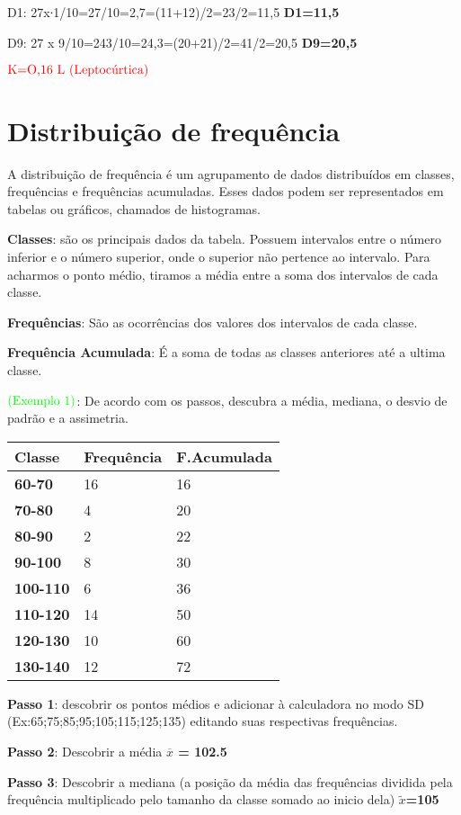 \documentclass[]{book}
\begin{document}
D1: 27x∙1/10=27/10=2,7=(11+12)/2=23/2=11,5 \textbf{D1=11,5}

D9: 27 x 9/10=243/10=24,3=(20+21)/2=41/2=20,5 \textbf{D9=20,5}

\(\color{red}{\text{K=O,16 L  (Leptocúrtica)}}\)

\hypertarget{distribuicao-de-frequencia-1}{%
\chapter{Distribuição de frequência}\label{distribuicao-de-frequencia-1}}

A distribuição de frequência é um agrupamento de dados distribuídos em classes, frequências e frequências acumuladas. Esses dados podem ser representados em tabelas ou gráficos, chamados de histogramas.

\textbf{Classes}: são os principais dados da tabela. Possuem intervalos entre o número inferior e o número superior, onde o superior não pertence ao intervalo. Para acharmos o ponto médio, tiramos a média entre a soma dos intervalos de cada classe.

\textbf{Frequências}: São as ocorrências dos valores dos intervalos de cada classe.

\textbf{Frequência Acumulada}: É a soma de todas as classes anteriores até a ultima classe.

\(\color{green}{\text{(Exemplo 1)}}\): De acordo com os passos, descubra a média, mediana, o desvio de padrão e a assimetria.

\begin{longtable}[]{@{}lll@{}}
\toprule
\textbf{Classe} & \textbf{Frequência} & \textbf{F.Acumulada}\tabularnewline
\midrule
\endhead
\textbf{60-70} & 16 & 16\tabularnewline
\textbf{70-80} & 4 & 20\tabularnewline
\textbf{80-90} & 2 & 22\tabularnewline
\textbf{90-100} & 8 & 30\tabularnewline
\textbf{100-110} & 6 & 36\tabularnewline
\textbf{110-120} & 14 & 50\tabularnewline
\textbf{120-130} & 10 & 60\tabularnewline
\textbf{130-140} & 12 & 72\tabularnewline
\bottomrule
\end{longtable}

\textbf{Passo 1}: descobrir os pontos médios e adicionar à calculadora no modo SD (Ex:65;75;85;95;105;115;125;135) editando suas respectivas frequências.

\textbf{Passo 2}: Descobrir a média \textbf{\(\overline x\) = 102.5}

\textbf{Passo 3}: Descobrir a mediana (a posição da média das frequências dividida pela frequência multiplicado pelo tamanho da classe somado ao inicio dela) \textbf{\(\tilde{x}\)=105}
\end{document}
